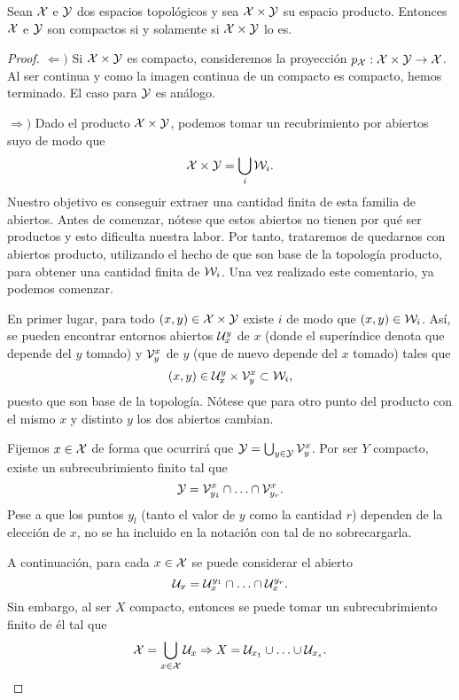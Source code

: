 \begin{theo} Sean $\mathcal{X}$ e $\mathcal{Y}$ dos espacios topológicos y sea $\mathcal{X} \times \mathcal{Y}$ su espacio producto. Entonces $\mathcal{X}$ e $\mathcal{Y}$ son compactos si y solamente si $\mathcal{X}\times \mathcal{Y}$ lo es.
	\begin{proof}
		
		$\Leftarrow )$ Si $\mathcal{X}\times \mathcal{Y}$ es compacto, consideremos la proyección $p_{\mathcal{X}}: \mathcal{X}\times \mathcal{Y} \to \mathcal{X}$. Al ser continua y como la imagen continua de un compacto es compacto, hemos terminado. El caso para $\mathcal{Y}$ es análogo. 
		
		$\Rightarrow )$ Dado el producto $\mathcal{X}\times \mathcal{Y}$, podemos tomar un recubrimiento por abiertos suyo de modo que 
		\[\mathcal{X}\times \mathcal{Y}=\bigcup_{i}\mathcal{W}_i.\]
		Nuestro objetivo es conseguir extraer una cantidad finita de esta familia de abiertos. Antes de comenzar, nótese que estos abiertos no tienen por qué ser productos y esto dificulta nuestra labor. Por tanto, trataremos de quedarnos con abiertos producto, utilizando el hecho de que son base de la topología producto, para obtener una cantidad finita de $\mathcal{W}_i$. Una vez realizado este comentario, ya podemos comenzar. 
		
		En primer lugar, para todo $(x,y)\in\mathcal{X}\times \mathcal{Y}$ existe $i$ de modo que $(x,y)\in \mathcal{W}_i$. Así, se pueden encontrar entornos abiertos $\mathcal{U}^y_x$ de $x$ (donde el superíndice denota que depende del $y$ tomado) y $\mathcal{V}_y^x$ de $y$ (que de nuevo depende del $x$ tomado) tales que
		\begin{equation}\label{T6:tychonoff1}
			(x,y)\in \mathcal{U}^y_x\times \mathcal{V}_y^x \subset \mathcal{W}_i,
		\end{equation}
		puesto que son base de la topología. Nótese que para otro punto del producto con el mismo $x$ y distinto $y$ los dos abiertos cambian.
		
		Fijemos $x\in \mathcal{X}$ de forma que ocurrirá que $\mathcal{Y}=\bigcup_{y\in \mathcal{Y}} \mathcal{V}_y^x$. Por ser $Y$ compacto, existe un subrecubrimiento finito tal que 
		\begin{equation}\label{T6:tychonoff4}
			\mathcal{Y}=\mathcal{V}^x_{y_1}\cap \ldots \cap \mathcal{V}^x_{y_r}.
		\end{equation}
		Pese a que los puntos $y_l$ (tanto el valor de $y$ como la cantidad $r$) dependen de la elección de $x$, no se ha incluido en la notación con tal de no sobrecargarla. 
		
		A continuación, para cada $x\in \mathcal{X}$ se puede considerar el abierto
		\begin{equation}\label{T6:tychonoff2}
			\mathcal{U}_x=\mathcal{U}_x^{y_1}\cap \ldots \cap \mathcal{U}_x^{y_r}.
		\end{equation}
		Sin embargo, al ser $X$ compacto, entonces se puede tomar un subrecubrimiento finito de él tal que
		\begin{equation}\label{T6:tychonoff3}
			\mathcal{X}=\bigcup_{x\in \mathcal{X}}\mathcal{U}_x\Rightarrow X=\mathcal{U}_{x_1}\cup \ldots \cup \mathcal{U}_{x_s}.
		\end{equation}
		

\end{proof}
\end{theo}
